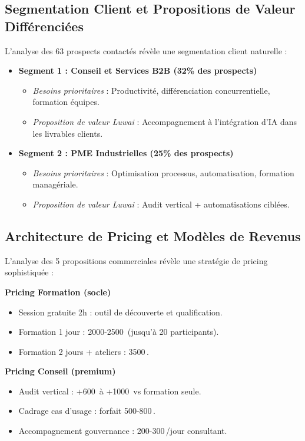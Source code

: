 \subsection{Segmentation Client et Propositions de Valeur Différenciées}

L'analyse des 63 prospects contactés révèle une segmentation client naturelle :

\begin{itemize}
    \item \textbf{Segment 1 : Conseil et Services B2B (32\% des prospects)}
    \begin{itemize}
        \item \emph{Besoins prioritaires} : Productivité, différenciation concurrentielle, formation équipes.
        \item \emph{Proposition de valeur Luwai} : Accompagnement à l'intégration d'IA dans les livrables clients.
    \end{itemize}
    \item \textbf{Segment 2 : PME Industrielles (25\% des prospects)}
    \begin{itemize}
        \item \emph{Besoins prioritaires} : Optimisation processus, automatisation, formation managériale.
        \item \emph{Proposition de valeur Luwai} : Audit vertical + automatisations ciblées.
    \end{itemize}
\end{itemize}

\subsection{Architecture de Pricing et Modèles de Revenus}

L'analyse des 5 propositions commerciales \cite{luwai2025aesio, luwai2025antilogy, luwai2025integrhale, luwai2025carecall, luwai2025tectona} révèle une stratégie de pricing sophistiquée :

\textbf{Pricing Formation (socle)}
\begin{itemize}
    \item Session gratuite 2h : outil de découverte et qualification.
    \item Formation 1 jour : 2000-2500\,\texteuro{} (jusqu'à 20 participants).
    \item Formation 2 jours + ateliers : 3500\,\texteuro{}.
\end{itemize}

\textbf{Pricing Conseil (premium)}
\begin{itemize}
    \item Audit vertical : +600\,\texteuro{} à +1000\,\texteuro{} vs formation seule.
    \item Cadrage cas d'usage : forfait 500-800\,\texteuro{}.
    \item Accompagnement gouvernance : 200-300\,\texteuro{}/jour consultant.
\end{itemize}

